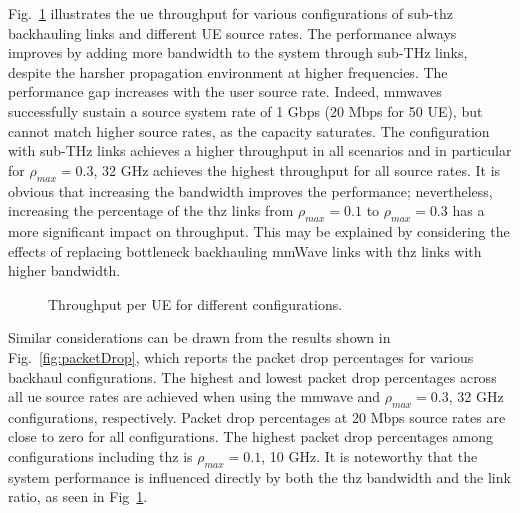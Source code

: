 Fig.~\ref{fig:Throughput} illustrates the \gls{ue} throughput for various configurations of sub-\gls{thz} backhauling links and different UE source rates. 
The performance always improves by adding more bandwidth to the system through sub-THz links, despite the harsher propagation environment at higher frequencies.
The performance gap increases with the user source rate. Indeed, 
\glspl{mmwave} successfully sustain a source system rate of 1 Gbps (20 Mbps for 50 UE), 
%
%
but cannot match higher source rates, as the capacity saturates.
The configuration with sub-THz links achieves a higher throughput in all scenarios and in particular for $\rho_{max} = 0.3$, 32 GHz achieves the highest throughput for all source rates. It is obvious that increasing the bandwidth improves the performance; nevertheless, increasing the percentage of the \gls{thz} links from $\rho_{max} = 0.1$ to $\rho_{max} = 0.3$ has a more significant impact on throughput. 
This may be explained by considering the effects of replacing bottleneck backhauling mmWave links with \gls{thz} links with higher bandwidth.


\begin{figure}
    \centering
    \setlength{}
    \setlength{}
    
    \caption{Throughput per UE for different configurations.}
    \label{fig:Throughput}
\end{figure}


Similar considerations can be drawn from the results shown in Fig.~\ref{fig:packetDrop}, which reports the packet drop percentages for various backhaul configurations. %
The highest and lowest packet drop percentages across all \gls{ue} source rates are achieved when using the \gls{mmwave} and $\rho_{max} = 0.3$, 32 GHz configurations, respectively. Packet drop percentages at 20 Mbps source rates are close to zero for all configurations. The highest packet drop percentages among configurations including \gls{thz} is $\rho_{max} = 0.1$, 10 GHz. It is noteworthy that the system performance is influenced directly by both the \gls{thz} bandwidth and the link ratio, as seen in Fig~\ref{fig:Throughput}.

